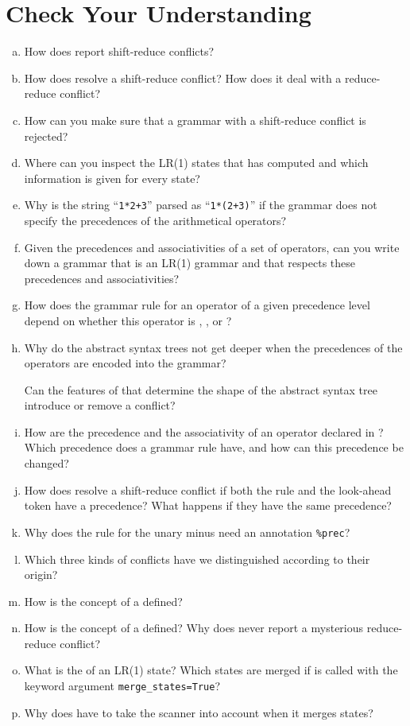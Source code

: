 \section{Check Your Understanding}
\begin{enumerate}[(a)]
\item How does  report shift-reduce conflicts?
\item How does  resolve a shift-reduce conflict?  How does it deal with a reduce-reduce
      conflict?
\item How can you make sure that a grammar with a shift-reduce conflict is rejected?
\item Where can you inspect the LR(1) states that  has computed and which information is
      given for every state?
\item Why is the string ``\texttt{1*2+3}'' parsed as ``\texttt{1*(2+3)}'' if the grammar does not
      specify the precedences of the arithmetical operators?
\item Given the precedences and associativities of a set of operators, can you write down a grammar that is an
      LR(1) grammar and that respects these precedences and associativities?
\item How does the grammar rule for an operator of a given precedence level depend on whether this operator is
      , , or ?
\item Why do the abstract syntax trees not get deeper when the precedences of the operators are encoded into the
      grammar?

      Can the features of  that determine the shape of the abstract syntax tree introduce or
      remove a conflict?
\item How are the precedence and the associativity of an operator declared in ?  Which
      precedence does a grammar rule have, and how can this precedence be changed?
\item How does  resolve a shift-reduce conflict if both the rule and the look-ahead token have a
      precedence?  What happens if they have the same precedence?
\item Why does the rule for the unary minus need an annotation \texttt{\%prec}?
\item Which three kinds of conflicts have we distinguished according to their origin?
\item How is the concept of a  defined?
\item How is the concept of a  defined?  Why does 
      never report a mysterious reduce-reduce conflict?
\item What is the  of an LR(1) state?  Which states are merged if  is called with
      the keyword argument \texttt{merge\_states=True}?
\item Why does  have to take the scanner into account when it merges states?
\end{enumerate}

